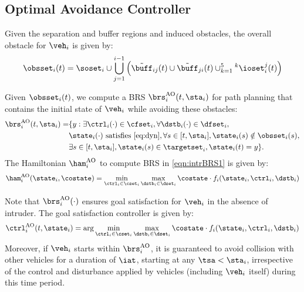 \subsection{Optimal Avoidance Controller} \label{sec:intruder_avoid}
Given the separation and buffer regions and induced obstacles, the overall obstacle for $\veh_i$ is given by:
\begin{equation}
\label{eq:obsseti_intr}
\obsset_i(t)  = \soset_i \cup \bigcup_{j=1}^{i-1} \left( \tilde{\buff}_{ij}(t) \cup \tilde{\buff}_{ji}(t) \cup_{k=1}^{5} {^k\ioset_i^j}(t) \right)
\end{equation}

Given $\obsset_i(t)$, we compute a BRS $\brs^{\text{AO}}_{i}(t, \sta_i)$ for path planning that contains the initial state of $\veh_i$ while avoiding these obstacles:
\begin{equation} \label{eqn:intrBRS1}
\begin{aligned}
\brs^{\text{AO}}_{i}(t, \sta_i) = & \{y: \exists \ctrl_i(\cdot) \in \cfset_i, \forall \dstb_i(\cdot) \in \dfset_i, \\
& \state_i(\cdot) \text{ satisfies \eqref{eq:dyn}}, \forall s \in [t, \sta_i], \state_i(s) \notin \obsset_i(s), \\
& \exists s \in [t, \sta_i], \state_i(s) \in \targetset_i, \state_i(t) = y \}.
\end{aligned}
\end{equation}
The Hamiltonian $\ham^{\text{AO}}_{i}$ to compute BRS in \eqref{eqn:intrBRS1} is given by:
\begin{equation} \label{eqn:BRSham}
\ham^{\text{AO}}_{i}(\state_i, \costate) = \min_{\ctrl_i \in \cset_i} \max_{\dstb_i \in \dset_i} \costate \cdot f_i (\state_i, \ctrl_i, \dstb_i)
\end{equation}

Note that $\brs^{\text{AO}}_{i}(\cdot)$ ensures goal satisfaction for $\veh_i$ in the absence of intruder. The goal satisfaction controller is given by:
\begin{equation}
{\ctrl^{\text{AO}}_{i}}(t, \state_i) = \arg \min_{\ctrl_i \in \cset_i} \max_{\dstb_i \in \dset_i} \costate \cdot f_i (\state_i, \ctrl_i, \dstb_i)
\end{equation}
Moreover, if $\veh_i$ starts within $\brs^{\text{AO}}_{i}$, it is guaranteed to avoid collision with other vehicles for a duration of $\iat$, starting at any $\tsa < \sta_i$, irrespective of the control and disturbance applied by vehicles (including $\veh_i$ itself) during this time period. 

